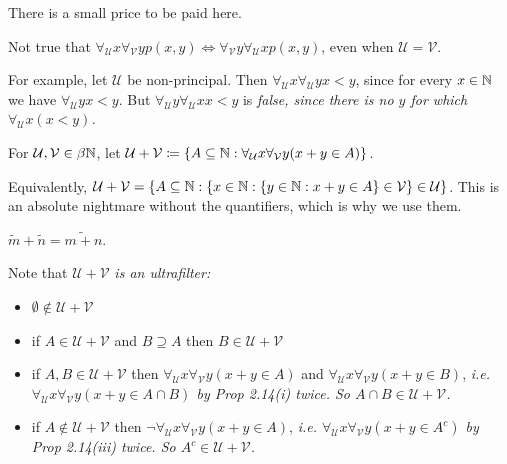 \documentclass[10pt]{article}
\newcommand{\U}{\mathcal{U}}
\newcommand{\V}{\mathcal{V}}
\newcommand{\fu}{\forall_\U}
\newcommand{\for}[1]{\forall_{#1}}
\begin{document}
There is a small price to be paid here.

\begin{remark*}
    Not true that $\fu x\for{\V}y p(x,y) \iff \for{\V}y \fu xp(x,y)$, even when $\U = \V$.

    For example, let $\U$ be non-principal. Then $\fu x\fu y x < y$, since for every $x\in \mathbb{N}$ we have $\fu y x < y$. But $\fu y \fu x x <y$ is \it{false}, since there is no $y$ for which $\fu x (x<y)$.
\end{remark*}

\begin{defin*}
    For $\U,\V\in \beta\N$, let $\U + \V \coloneqq \{A\subset\N : \fu x\for{\V}y (x+y\in A)\}$.

    Equivalently, $\U+\V = \{A\subset\N : \{x\in \N : \{y \in \N : x + y \in A\} \in \V\}\in \U\}$. This is an absolute nightmare without the quantifiers, which is why we use them.
\end{defin*}

\begin{remark*}[Example] $\tilde{m} + \tilde{n} = \widetilde{m+n}$.  
\end{remark*}

Note that $\U + \V$ \it{is} an ultrafilter:
\begin{itemize}
    \item $\emptyset\not\in \U + \V$
    \item if $A \in \U + \V$ and $B \supseteq A$ then $B \in \U + \V$
    \item if $A,B\in \U + \V$ then $\fu x \for{\V} y (x + y \in A)$ and $\fu x \for{\V} y (x + y \in B)$, \it{i.e.} $\fu x\for{\V} y (x + y \in A \cap B)$ by Prop 2.14(i) twice. So $A\cap B \in \U + \V$.
    \item if $A\not\in \U + \V$ then $\neg \fu x\for{\V} y (x + y \in A)$, \it{i.e.} $\fu x \for{\V} y (x + y \in A^c)$ by Prop 2.14(iii) twice. So $A^c \in \U + \V$.
\end{itemize}
\end{document}

